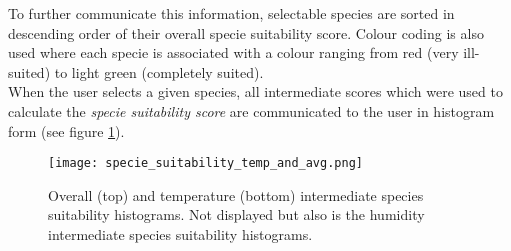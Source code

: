 To further communicate this information, selectable species are sorted in descending order of their overall specie suitability score. Colour coding is also used where each specie is associated with a colour ranging from red (very ill-suited) to light green (completely suited).\\

When the user selects a given species, all intermediate scores which were used to calculate the \textit{specie suitability score} are communicated to the user in histogram form (see figure \ref{fig:specie_intermediate_suitability_scores}).

\begin{figure}
\center
	\texttt{[image: specie\_suitability\_temp\_and\_avg.png]}
	\caption{ Overall (top) and temperature (bottom) intermediate species suitability histograms. Not displayed but also is the humidity intermediate species suitability histograms.}	
	\label{fig:specie_intermediate_suitability_scores}
\end{figure}


